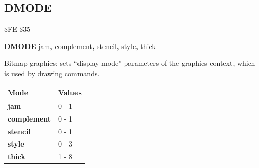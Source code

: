 
\newpage
\subsection{DMODE}
\begin{description}[leftmargin=2cm,style=nextline]
\item [Token:] \$FE \$35
\item [Format:] {\bf DMODE} jam{\bf,} complement{\bf,}
		stencil{\bf,} style{\bf,} thick
\item [Usage:]
   Bitmap graphics: sets ``display mode'' parameters of the graphics
   context, which is used by drawing commands.

\begin{center}
\begin{tabular}{|l|l|}
\hline
   {\bf Mode} & {\bf Values}\\
\hline
   {\bf jam}        &  0 - 1 \\
   {\bf complement} &  0 - 1 \\
   {\bf stencil}    &  0 - 1 \\
   {\bf style}      &  0 - 3 \\
   {\bf thick}      &  1 - 8 \\
\hline
\end{tabular}
\end{center}
\end{description}


\newpage
